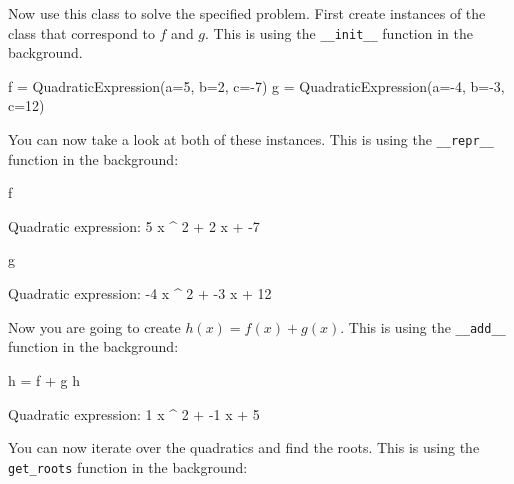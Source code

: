 Now use this class to solve the specified problem. First create
instances of the class that correspond to \(f\) and \(g\). This is using the \texttt{\_\_init\_\_}
function in the background.




\begin{pyin}
f = QuadraticExpression(a=5, b=2, c=-7)
g = QuadraticExpression(a=-4, b=-3, c=12)
\end{pyin}





You can now take a look at both of these instances. This is using the \texttt{\_\_repr\_\_}
function in the background:




\begin{pyin}
f
\end{pyin}





\begin{raw}
Quadratic expression: 5 x ^ 2 + 2 x + -7
\end{raw}







\begin{pyin}
g
\end{pyin}





\begin{raw}
Quadratic expression: -4 x ^ 2 + -3 x + 12
\end{raw}





Now you are going to create \(h(x) = f(x) + g(x)\). This is using the \texttt{\_\_add\_\_}
function in the background:




\begin{pyin}
h = f + g
h
\end{pyin}





\begin{raw}
Quadratic expression: 1 x ^ 2 + -1 x + 5
\end{raw}





You can now iterate over the quadratics and find the roots. This is using the
\texttt{get\_roots} function in the background:





